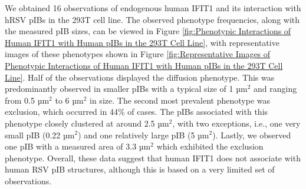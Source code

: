 We obtained 16 observations of endogenous human IFIT1 and its interaction with hRSV pIBs in the 293T cell line. The observed phenotype frequencies, along with the measured pIB sizes, can be viewed in Figure \ref{fig:Phenotypic Interactions of Human IFIT1 with Human pIBs in the 293T Cell Line}, with representative images of these phenotypes shown in Figure \ref{fig:Representative Images of Phenotypic Interactions of Human IFIT1 with Human pIBs in the 293T Cell Line}. Half of the observations displayed the diffusion phenotype. This was predominantly observed in smaller pIBs with a typical size of 1 \(\mbox{µm}^2\) and ranging from 0.5 \(\mbox{µm}^2\) to 6 \(\mbox{µm}^2\) in size. The second most prevalent phenotype was exclusion, which occurred in 44\% of cases. The pIBs associated with this phenotype closely clustered at around 2.5 \(\mbox{µm}^2\), with two exceptions, i.e., one very small pIB (0.22 \(\mbox{µm}^2\)) and one relatively large pIB (5 \(\mbox{µm}^2\)). Lastly, we observed one pIB with a measured area of 3.3 \(\mbox{µm}^2\) which exhibited the exclusion phenotype. Overall, these data suggest that human IFIT1 does not associate with human RSV pIB structures, although this is based on a very limited set of observations.

